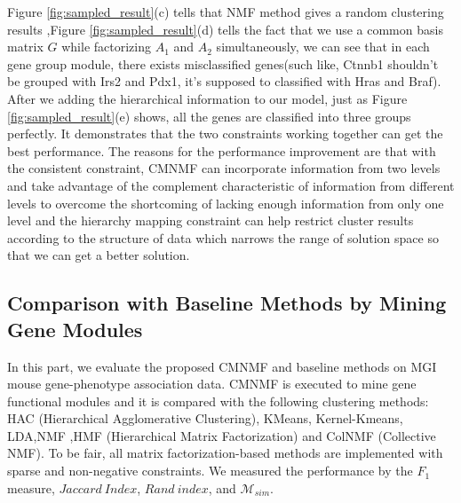 \documentclass{bmcart}
\begin{document}
   Figure \ref{fig:sampled_result}(c) tells that NMF method gives a random clustering results ,Figure \ref{fig:sampled_result}(d) tells the fact that we use a common basis matrix $G$ while factorizing $A_1$ and $A_2$ simultaneously, we can see that in each gene group module, there exists misclassified genes(such like, Ctnnb1 shouldn't be grouped with Irs2 and Pdx1, it's supposed to classified with Hras and Braf). After we adding the hierarchical information to our model, just as Figure \ref{fig:sampled_result}(e) shows, all the genes are classified into three groups perfectly. It demonstrates that the two constraints working together can get the best performance. The reasons for the performance improvement are that with the consistent constraint, CMNMF can incorporate information from two levels and take advantage of the complement characteristic of information from different levels to overcome the shortcoming of lacking enough information from only one level and the hierarchy mapping constraint can help restrict cluster results according to the structure of data which narrows the range of solution space so that we can get a better solution.

\subsection*{\textbf{Comparison with Baseline Methods by Mining Gene Modules}}
In this part, we evaluate the proposed CMNMF and baseline methods on MGI mouse gene-phenotype association data.
CMNMF is executed to mine gene functional modules and it is compared with the following clustering methods: HAC (Hierarchical Agglomerative Clustering)\cite{Ward1963}, KMeans, Kernel-Kmeans\cite{Dhillon2004}, LDA\cite{Blei2003},NMF\cite{Mika1999} ,HMF (Hierarchical Matrix Factorization) \cite{AliMashhoori2012} and ColNMF (Collective NMF)\cite{Singh2008}. To be fair, all matrix factorization-based methods are implemented with sparse and non-negative constraints. We measured the performance by the $F_1$ measure, $Jaccard\ Index$, $Rand\ index$, and $\mathcal{M}_{sim}$.
\end{document}
